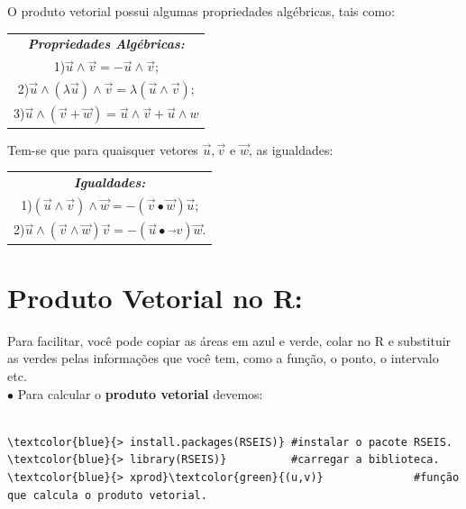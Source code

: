 \documentclass[12pt,a4paper]{article}
\begin{document}
	
	O produto vetorial possui algumas propriedades algébricas, tais como:
	
	\begin{center}
		\vspace{0.2cm}
		\begin{tabular}{|c|}
			\hline
			\textit{\textbf{Propriedades Algébricas:}} \\
			1)$\vec{u}\wedge\vec{v} = - \vec{u}\wedge\vec{v} $;\\
			2)$\vec{u}\wedge(\lambda\vec{u})\wedge\vec{v} = \lambda(\vec{u}\wedge\vec{v})$;\\
			3)$\vec{u}\wedge(\vec{v} + \vec{w}) = \vec{u}\wedge\vec{v} + \vec{u}\wedge{w}$\\
			\hline
		\end{tabular}
	\end{center}
	
	Tem-se que para quaisquer vetores $\vec{u},\vec{v}$ e $\vec{w}$, as igualdades:\\
	
	\begin{center}
		\begin{tabular}{|c|}
			\hline
			\textit{\textbf{Igualdades:}} \\
			1)$(\vec{u}\wedge\vec{v})\wedge\vec{w} = -(\vec{v}\bullet\vec{w})\vec{u}$;\\
			2)$\vec{u}\wedge(\vec{v}\wedge\vec{w})\vec{v} = - (\vec{u}\bullet\vec{}v)\vec{w}$.\\
			\hline
		\end{tabular}
	\end{center}
	
	\section*{Produto Vetorial no R:}
	
	Para facilitar, você pode copiar as áreas em azul e verde, colar no R e substituir as
	verdes pelas informações que você tem, como a função, o ponto, o intervalo etc.\\
	\newline
	$\bullet$ Para calcular o \textbf{produto vetorial} devemos:
	
    	
    {
    	
    	\begin{Verbatim}[commandchars=\\\{\}]
    		
\textcolor{blue}{> install.packages(RSEIS)} #instalar o pacote RSEIS.
\textcolor{blue}{> library(RSEIS)}          #carregar a biblioteca.
\textcolor{blue}{> xprod}\textcolor{green}{(u,v)}              #função que calcula o produto vetorial.
    	\end{Verbatim}
    }
 
\end{document}
